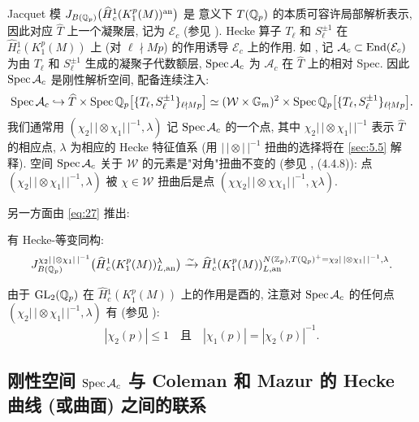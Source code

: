 Jacquet 模 $J_{B(\mathbb{Q}_p)}\bigl(\widehat{H}{}_{c}^{1}(K_1^{p}(M))^{\mathrm{an}}\bigr)$ 是 \cite{ref:21} 意义下 $T(\mathbb{Q}_p)$ 的本质可容许局部解析表示, 因此对应 $\widehat{T}$ 上一个凝聚层, 记为 $\mathcal{E}_c$ (参见 \cite[\S4.4]{ref:24}).
Hecke 算子 $T_{\ell}$ 和 $S_{\ell}^{\pm 1}$ 在 $\widehat{H}{}_{c}^{1}(K_1^{p}(M))$ 上 (对 $\ell \nmid Mp$) 的作用诱导 $\mathcal{E}_c$ 上的作用.
如 \cite[\S4.4]{ref:24}, 记 $\mathcal{A}_c \subset \operatorname{End}(\mathcal{E}_c)$ 为由 $T_{\ell}$ 和 $S_{\ell}^{\pm 1}$ 生成的凝聚子代数额层, $\operatorname{Spec} \mathcal{A}_c$ 为 $\mathcal{A}_c$ 在 $\widehat{T}$ 上的相对 Spec.
因此 $\operatorname{Spec} \mathcal{A}_c$ 是刚性解析空间, 配备连续注入:
\[
\operatorname{Spec} \mathcal{A}_c \hookrightarrow \widehat{T} \times \operatorname{Spec} \mathbb{Q}_p\bigl[\{T_{\ell},S_{\ell}^{\pm 1}\}_{\ell \nmid Mp}\bigr]
\simeq (\mathcal{W} \times \mathbb{G}_m)^{2} \times \operatorname{Spec} \mathbb{Q}_p\bigl[\{T_{\ell},S_{\ell}^{\pm 1}\}_{\ell \nmid Mp}\bigr].
\]
我们通常用 $(\chi_2|\,| \otimes \chi_1|\,|^{-1},\lambda)$ 记 $\operatorname{Spec} \mathcal{A}_c$ 的一个点, 其中 $\chi_2|\,| \otimes \chi_1|\,|^{-1}$ 表示 $\widehat{T}$ 的相应点, $\lambda$ 为相应的 Hecke 特征值系 (用 $|\,| \otimes |\,|^{-1}$ 扭曲的选择将在 \ref{sec:5.5} 解释).
空间 $\operatorname{Spec} \mathcal{A}_c$ 关于 $\mathcal{W}$ 的元素是"对角"扭曲不变的 (参见 \cite{ref:24}, (4.4.8)): 点 $(\chi_2|\,| \otimes \chi_1|\,|^{-1},\lambda)$ 被 $\chi \in \mathcal{W}$ 扭曲后是点 $(\chi\chi_2|\,| \otimes \chi\chi_1|\,|^{-1},\chi\lambda)$.

另一方面由 \eqref{eq:27} 推出:

\begin{proposition}\label{prop:5.2.1}
有 Hecke-等变同构:
\[
J_{B(\mathbb{Q}_p)}^{\chi_2|\,| \otimes \chi_1|\,|^{-1}}\bigl(\widehat{H}{}_{c}^{1}(K_1^{p}(M))_{L,\mathrm{an}}^{\lambda}\bigr)
\xrightarrow{\sim} \widehat{H}{}_{c}^{1}(K_1^{p}(M))_{L,\mathrm{an}}^{N(\mathbb{Z}_p),T(\mathbb{Q}_p)^{+} = \chi_2|\,| \otimes \chi_1|\,|^{-1},\lambda}.
\]
\end{proposition}

由于 $\mathrm{GL}_2(\mathbb{Q}_p)$ 在 $\widehat{H}{}_{c}^{1}(K_1^{p}(M))$ 上的作用是酉的, 注意对 $\operatorname{Spec} \mathcal{A}_c$ 的任何点 $(\chi_2|\,| \otimes \chi_1|\,|^{-1},\lambda)$ 有 (参见 \cite[Lem.~4.4.2]{ref:22}):
\begin{equation}
\label{eq:28}
|\chi_2(p)| \le 1 \quad \text{且} \quad |\chi_1(p)| = |\chi_2(p)|^{-1}.
\end{equation}

\subsection{刚性空间 $\operatorname{Spec} \mathcal{A}_c$ 与 Coleman 和 Mazur 的 Hecke 曲线 (或曲面) 之间的联系}\label{sec:5.3}

